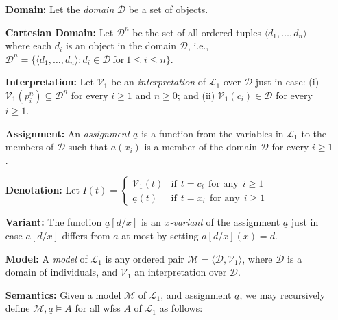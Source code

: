 \documentclass[a4paper, 11pt]{article} %
\newcommand{\tuple}[1]{\langle#1\rangle} %
\newcommand{\set}[1]{\lbrace#1\rbrace} %
\newcommand{\V}[0]{\mathcal{V}}
\renewcommand{\L}[0]{\mathcal{L}}
\begin{document}
\begin{enumerate}[leftmargin=1.2in,labelsep=.15in] %
\item[\bf Domain:] Let the \textit{domain} $\mathcal{D}$ be a set of objects.%
\item[\bf Cartesian Domain:] Let $\mathcal{D}^n$ be the set of all ordered tuples $\tuple{d_1,\dots,d_n}$ where each $d_i$ is an object in the domain $\mathcal{D}$, i.e., $\mathcal{D}^n=\set{\tuple{d_1,\dots,d_n}:d_i\in\mathcal{D}~\text{for}~1\leq i\leq n}$.
\item[\bf Interpretation:] Let $\V_1$ be an \textit{interpretation} of $\L_1$ over $\mathcal{D}$ just in case: (i) $\V_1(p_i^n)\subseteq\mathcal{D}^n$ for every $i\geq1$ and $n\geq0$; and (ii) $\V_1(c_i)\in\mathcal{D}$ for every $i\geq1$.
\item[\bf Assignment:] An \textit{assignment} $\underline{a}$ is a function from the variables in $\L_1$ to the members of $\mathcal{D}$ such that $\underline{a}(x_i)$ is a member of the domain $\mathcal{D}$ for every $i\geq1$.
\item[\bf Denotation:] Let $I(t)=
	\begin{cases} 
		\V_1(t) & \text{if}~~ t=c_i ~~\text{for any}~~ i\geq1\\
		\underline{a}(t) & \text{if}~~ t=x_i ~~\text{for any}~~ i\geq1
	\end{cases}$
\item[\bf Variant:] The function $\underline{a}[d/x]$ is an \textit{$x$-variant} of the assignment $\underline{a}$ just in case $\underline{a}[d/x]$ differs from $\underline{a}$ at most by setting $\underline{a}[d/x](x)=d$.
\item[\bf Model:] A \textit{model} of $\L_1$ is any ordered pair $\mathcal{M}=\tuple{\mathcal{D},\V_1}$, where $\mathcal{D}$ is a domain of individuals, and $\V_1$ an interpretation over $\mathcal{D}$.
\item[\bf Semantics:] Given a model $\mathcal{M}$ of $\L_1$, and assignment $\underline{a}$, we may recursively define $\mathcal{M},\underline{a}\vDash A$ for all wfss $A$ of $\L_1$ as follows:
\begin{small}
\begin{itemize}[leftmargin=.36in]

\end{itemize}
\end{small}
\end{enumerate}
\end{document}
